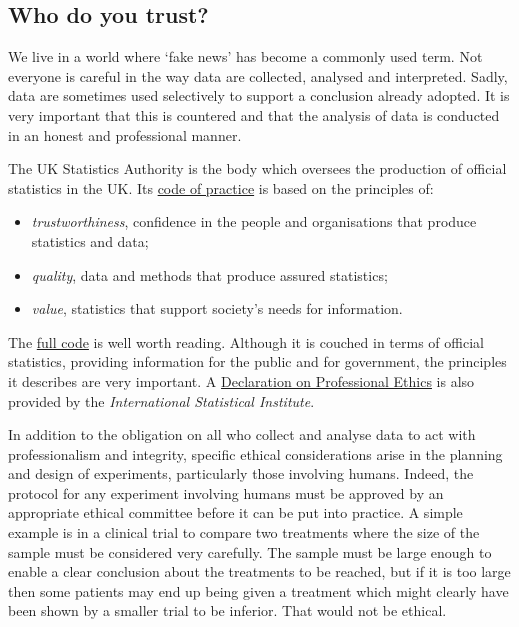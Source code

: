 \documentclass[
]{book}
\providecommand{\tightlist}{%
  \setlength{\itemsep}{0pt}\setlength{\parskip}{0pt}}
\begin{document}
\subsection{Who do you trust?}\label{who-do-you-trust}

We live in a world where `fake news' has become a commonly used term. Not everyone is careful in the way data are collected, analysed and interpreted. Sadly, data are sometimes used selectively to support a conclusion already adopted. It is very important that this is countered and that the analysis of data is conducted in an honest and professional manner.

The UK Statistics Authority is the body which oversees the production of official statistics in the UK. Its \href{https://code.statisticsauthority.gov.uk}{code of practice} is based on the principles of:

\begin{itemize}
\tightlist
\item
  \emph{trustworthiness}, confidence in the people and organisations that produce statistics and data;
\item
  \emph{quality}, data and methods that produce assured statistics;
\item
  \emph{value}, statistics that support society's needs for information.
\end{itemize}

The \href{https://code.statisticsauthority.gov.uk/wp-content/uploads/2022/05/Code-of-Practice-for-Statistics-REVISED.pdf}{full code} is well worth reading. Although it is couched in terms of official statistics, providing information for the public and for government, the principles it describes are very important. A \href{https://isi-web.org/declaration-professional-ethics}{Declaration on Professional Ethics} is also provided by the \emph{International Statistical Institute}.

In addition to the obligation on all who collect and analyse data to act with professionalism and integrity, specific ethical considerations arise in the planning and design of experiments, particularly those involving humans. Indeed, the protocol for any experiment involving humans must be approved by an appropriate ethical committee before it can be put into practice. A simple example is in a clinical trial to compare two treatments where the size of the sample must be considered very carefully. The sample must be large enough to enable a clear conclusion about the treatments to be reached, but if it is too large then some patients may end up being given a treatment which might clearly have been shown by a smaller trial to be inferior. That would not be ethical.
\end{document}
